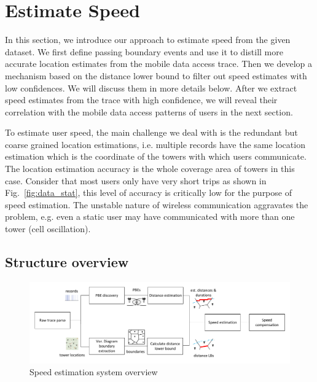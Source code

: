 \section{Estimate Speed}

In this section, we introduce our approach to estimate speed from the given dataset. We first define passing boundary events and use it to distill more accurate location estimates from the mobile data access trace. Then we develop a mechanism based on the distance lower bound to filter out speed estimates with low confidences. We will discuss them in more details below. After we extract speed estimates from the trace with high confidence, we will reveal their correlation with the mobile data access patterns of users in the next section. 

To estimate user speed, the main challenge we deal with is the redundant but coarse grained location estimations, i.e. multiple records have the same location estimation which is the coordinate of the towers with which users communicate. The location estimation accuracy is the whole coverage area of towers in this case. Consider that most users only have very short trips as shown in Fig.~\ref{fig:data_stat}, this level of accuracy is critically low for the purpose of speed estimation. The unstable nature of wireless communication aggravates the problem, e.g. even a static user may have communicated with more than one tower (cell oscillation). %

\subsection{Structure overview}

\begin{figure}[ht]
    \centering
    \includegraphics[width=\linewidth]{./figures/system_overview.pdf}
    \caption{Speed estimation system overview}
    \label{fig:system_overview}
\end{figure}

